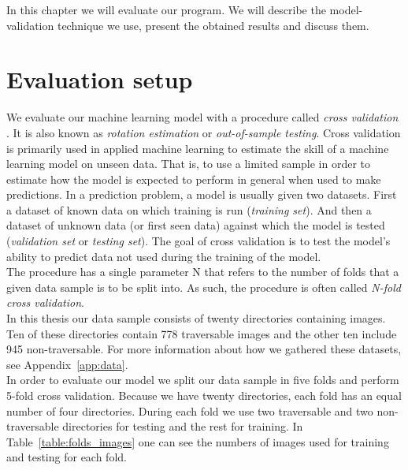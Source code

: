 \documentclass[12pt,a4paper,table,dvipsnames,tikz]{report}
\newcommand{\term}{\textit}
\newcommand{\bl}[1]{{\hypersetup{linkcolor=blue}#1}}
\begin{document}
	In this chapter we will evaluate our program. We will describe the model-validation 
	technique we use, present the obtained results and discuss them.
	\\
	
	\section{Evaluation setup}
	\label{sec:exp:eval}
	
	We evaluate our machine learning model with a procedure called \term{cross validation} 
	\citep{Brownlee}. It is also known as \term{rotation estimation} or \term{out-of-sample 
	testing}. Cross validation is primarily used in applied machine learning to estimate 
	the skill of a machine learning model on unseen data. That is, to use a limited sample 
	in order to estimate how the model is expected to perform in general when used to make 
	predictions. In a prediction problem, a model is usually given two datasets. First a 
	dataset of known data on which training is run (\term{training set}). And then a dataset 
	of unknown data (or first seen data) against which the model is tested (\term{validation 
	set} or \term{testing set}). The goal of cross validation is to test the model's ability 
	to predict data not used during the training of the model.
	\\
	
	The procedure has a single parameter N that refers to the number of folds that a given 
	data sample is to be split into. As such, the procedure is often called \term{N-fold 
	cross validation}.
	\\
	
	In this thesis our data sample consists of twenty directories containing images. 
	Ten of these directories contain 778 traversable images and the other ten include 
	945 non-traversable. For more information about how we gathered these datasets, see 
	Appendix~\ref{app:data}.
	\\
	
	In order to evaluate our model we split our data sample in five folds and perform 
	5-fold cross validation. Because we have twenty directories, each fold has an equal 
	number of four directories. During each fold we use two traversable and two non-traversable 
	directories for testing and the rest for training. In Table~\bl{\ref{table:folds_images}} 
	one can see the numbers of images used for training and testing for each fold.
	\\
	
\end{document}
